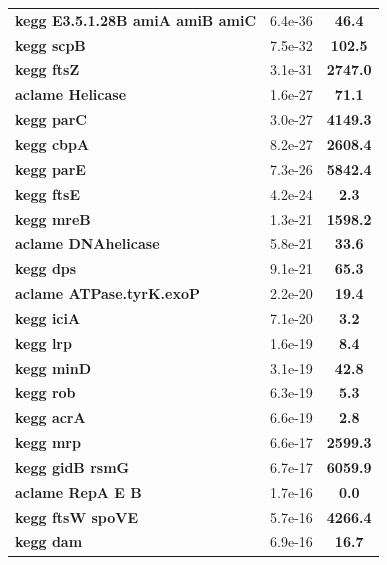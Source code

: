 \begin{landscape}
\begin{table}
{\begin{minipage}[t]{0.3\textwidth}
\begin{tabular}{>{\bfseries}p{\textwidth}cc}
\rowcolor{posit}kegg E3.5.1.28B amiA amiB amiC&6.4e-36&\textbf{\colorbox{colorpowerxxx}{46.4}}\\
\rowcolor{posit}kegg scpB&7.5e-32&\textbf{\colorbox{colorpowerxxxx}{102.5}}\\
\rowcolor{posit}kegg ftsZ&3.1e-31&\textbf{\colorbox{colorpowerxxxx}{2747.0}}\\
\rowcolor{posit}aclame Helicase&1.6e-27&\textbf{\colorbox{colorpowerxxxx}{71.1}}\\
\rowcolor{posit}kegg parC&3.0e-27&\textbf{\colorbox{colorpowerxxxx}{4149.3}}\\
\rowcolor{posit}kegg cbpA&8.2e-27&\textbf{\colorbox{colorpowerxxxx}{2608.4}}\\
\rowcolor{posit}kegg parE&7.3e-26&\textbf{\colorbox{colorpowerxxxx}{5842.4}}\\
\rowcolor{posit}kegg ftsE&4.2e-24&\textbf{\colorbox{colorpower}{2.3}}\\
\rowcolor{posit}kegg mreB&1.3e-21&\textbf{\colorbox{colorpowerxxxx}{1598.2}}\\
\rowcolor{posit}aclame DNAhelicase&5.8e-21&\textbf{\colorbox{colorpowerxxx}{33.6}}\\
\rowcolor{posit}kegg dps&9.1e-21&\textbf{\colorbox{colorpowerxxxx}{65.3}}\\
\rowcolor{posit}aclame ATPase.tyrK.exoP&2.2e-20&\textbf{\colorbox{colorpowerxx}{19.4}}\\
\rowcolor{posit}kegg iciA&7.1e-20&\textbf{\colorbox{colorpowerx}{3.2}}\\
\rowcolor{posit}kegg lrp&1.6e-19&\textbf{\colorbox{colorpowerxx}{8.4}}\\
\rowcolor{posit}kegg minD&3.1e-19&\textbf{\colorbox{colorpowerxxx}{42.8}}\\
\rowcolor{posit}kegg rob&6.3e-19&\textbf{\colorbox{colorpowerx}{5.3}}\\
\rowcolor{posit}kegg acrA&6.6e-19&\textbf{\colorbox{colorpowerx}{2.8}}\\
\rowcolor{posit}kegg mrp&6.6e-17&\textbf{\colorbox{colorpowerxxxx}{2599.3}}\\
\rowcolor{posit}kegg gidB rsmG&6.7e-17&\textbf{\colorbox{colorpowerxxxx}{6059.9}}\\
\rowcolor{posit}aclame RepA E B&1.7e-16&\textbf{\colorbox{colorpowernegxxx}{0.0}}\\
\rowcolor{posit}kegg ftsW spoVE&5.7e-16&\textbf{\colorbox{colorpowerxxxx}{4266.4}}\\
\rowcolor{posit}kegg dam&6.9e-16&\textbf{\colorbox{colorpowerxx}{16.7}}\\

\end{tabular}
\end{minipage}}
\end{table}
\end{landscape}
